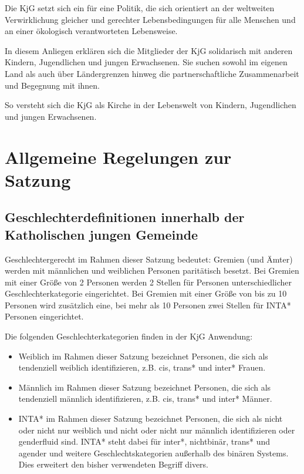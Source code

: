 \documentclass[12pt]{report}
\begin{document}
\begin{justify}
Die KjG setzt sich ein für eine Politik, die sich orientiert an der weltweiten Verwirklichung gleicher
und gerechter Lebensbedingungen für alle Menschen und an einer
ökologisch verantworteten Lebensweise.

In diesem Anliegen erklären sich die Mitglieder der KjG solidarisch mit anderen Kindern, Jugendlichen und jungen Erwachsenen.
Sie suchen sowohl im eigenen Land als auch über Ländergrenzen
hinweg die partnerschaftliche Zusammenarbeit und Begegnung mit ihnen.

So versteht sich die KjG als Kirche in der Lebenswelt von Kindern, Jugendlichen und jungen Erwachsenen.


\chapter{Allgemeine Regelungen zur Satzung}

\section{Geschlechterdefinitionen innerhalb der Katholischen jungen Gemeinde}\label{geschlechterdefinition}

Geschlechtergerecht im Rahmen dieser Satzung bedeutet: Gremien (und Ämter) werden mit männlichen und
weiblichen Personen paritätisch besetzt.
Bei Gremien mit einer Größe von 2 Personen werden 2 Stellen für Personen unterschiedlicher Geschlechterkategorie eingerichtet.
Bei Gremien mit einer Größe von bis zu 10 Personen wird zusätzlich
eine, bei mehr als 10 Personen zwei Stellen für INTA* Personen eingerichtet.

Die folgenden Geschlechterkategorien finden in der KjG Anwendung:


\begin{itemize}
    \item Weiblich im Rahmen dieser Satzung bezeichnet Personen, die sich als tendenziell weiblich
          identifizieren, z.B. cis, trans* und inter* Frauen.
    \item Männlich im Rahmen dieser Satzung bezeichnet Personen, die sich als tendenziell männlich
          identifizieren, z.B. cis, trans* und inter* Männer.
    \item INTA* im Rahmen dieser Satzung bezeichnet Personen, die sich als nicht oder nicht nur weiblich
          und nicht oder nicht nur männlich identifizieren oder genderfluid sind. 
          INTA* steht dabei für inter*, nichtbinär, trans* und agender und weitere Geschlechtskategorien 
          außerhalb des binären Systems. 
          Dies erweitert den bisher verwendeten Begriff divers.
\end{itemize}



\end{justify}
\end{document}
